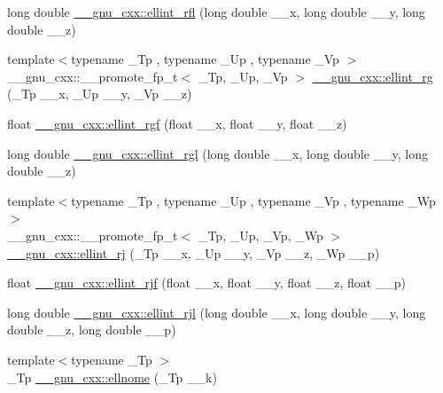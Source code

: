 \begin{DoxyCompactItemize}
long double \hyperlink{group__gnu__math__spec__func_ga38dd36b3db5bbe5da516d0cbe3ff1f21}{\+\_\+\+\_\+gnu\+\_\+cxx\+::ellint\+\_\+rfl} (long double \+\_\+\+\_\+x, long double \+\_\+\+\_\+y, long double \+\_\+\+\_\+z)
\item 
{\footnotesize template$<$typename \+\_\+\+Tp , typename \+\_\+\+Up , typename \+\_\+\+Vp $>$ }\\\+\_\+\+\_\+gnu\+\_\+cxx\+::\+\_\+\+\_\+promote\+\_\+fp\+\_\+t$<$ \+\_\+\+Tp, \+\_\+\+Up, \+\_\+\+Vp $>$ \hyperlink{group__gnu__math__spec__func_gab525116e1b311da90e2745366ac314eb}{\+\_\+\+\_\+gnu\+\_\+cxx\+::ellint\+\_\+rg} (\+\_\+\+Tp \+\_\+\+\_\+x, \+\_\+\+Up \+\_\+\+\_\+y, \+\_\+\+Vp \+\_\+\+\_\+z)
\item 
float \hyperlink{group__gnu__math__spec__func_ga7a4ab348bf312a3425501ac8a3d16494}{\+\_\+\+\_\+gnu\+\_\+cxx\+::ellint\+\_\+rgf} (float \+\_\+\+\_\+x, float \+\_\+\+\_\+y, float \+\_\+\+\_\+z)
\item 
long double \hyperlink{group__gnu__math__spec__func_ga563455d515ed845988552432108a21be}{\+\_\+\+\_\+gnu\+\_\+cxx\+::ellint\+\_\+rgl} (long double \+\_\+\+\_\+x, long double \+\_\+\+\_\+y, long double \+\_\+\+\_\+z)
\item 
{\footnotesize template$<$typename \+\_\+\+Tp , typename \+\_\+\+Up , typename \+\_\+\+Vp , typename \+\_\+\+Wp $>$ }\\\+\_\+\+\_\+gnu\+\_\+cxx\+::\+\_\+\+\_\+promote\+\_\+fp\+\_\+t$<$ \+\_\+\+Tp, \+\_\+\+Up, \+\_\+\+Vp, \+\_\+\+Wp $>$ \hyperlink{group__gnu__math__spec__func_gaf9a96979913713963c5f4edeba8c7f5a}{\+\_\+\+\_\+gnu\+\_\+cxx\+::ellint\+\_\+rj} (\+\_\+\+Tp \+\_\+\+\_\+x, \+\_\+\+Up \+\_\+\+\_\+y, \+\_\+\+Vp \+\_\+\+\_\+z, \+\_\+\+Wp \+\_\+\+\_\+p)
\item 
float \hyperlink{group__gnu__math__spec__func_gace85b5190b04f57493878c5d672cfabd}{\+\_\+\+\_\+gnu\+\_\+cxx\+::ellint\+\_\+rjf} (float \+\_\+\+\_\+x, float \+\_\+\+\_\+y, float \+\_\+\+\_\+z, float \+\_\+\+\_\+p)
\item 
long double \hyperlink{group__gnu__math__spec__func_gab5405f1669b3ce8b560dc33aa5b97287}{\+\_\+\+\_\+gnu\+\_\+cxx\+::ellint\+\_\+rjl} (long double \+\_\+\+\_\+x, long double \+\_\+\+\_\+y, long double \+\_\+\+\_\+z, long double \+\_\+\+\_\+p)
\item 
{\footnotesize template$<$typename \+\_\+\+Tp $>$ }\\\+\_\+\+Tp \hyperlink{group__gnu__math__spec__func_ga7bfb34f8b5c0ed7c72040f9cb7034bba}{\+\_\+\+\_\+gnu\+\_\+cxx\+::ellnome} (\+\_\+\+Tp \+\_\+\+\_\+k)
\item 

\end{DoxyCompactItemize}
